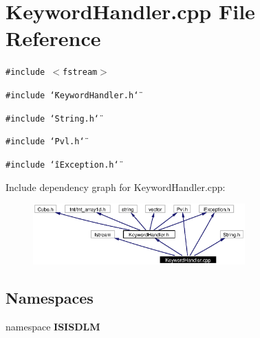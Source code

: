 \section{Keyword\-Handler.cpp File Reference}
\label{KeywordHandler_8cpp}
{\tt \#include $<$fstream$>$}\par
{\tt \#include \char`\"{}Keyword\-Handler.h\char`\"{}}\par
{\tt \#include \char`\"{}String.h\char`\"{}}\par
{\tt \#include \char`\"{}Pvl.h\char`\"{}}\par
{\tt \#include \char`\"{}i\-Exception.h\char`\"{}}\par


Include dependency graph for Keyword\-Handler.cpp:\begin{figure}[H]
\begin{center}
\leavevmode
\includegraphics[width=231pt]{KeywordHandler_8cpp__incl}
\end{center}
\end{figure}
\subsection*{Namespaces}
\begin{CompactItemize}
\item 
namespace {\bf ISISDLM}
\end{CompactItemize}
